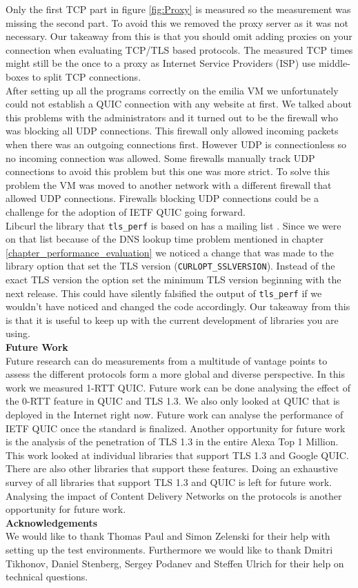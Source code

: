Only the first TCP part in figure \ref{fig:Proxy} is measured so the measurement was missing the second part.
To avoid this we removed the proxy server as it was not necessary.
Our takeaway from this is that you should omit adding proxies on your connection when evaluating TCP/TLS based protocols.
The measured TCP times might still be the once to a proxy as Internet Service Providers (ISP) use middle-boxes to split TCP connections. \\


After setting up all the programs correctly on the emilia VM we unfortunately could not establish a QUIC connection with any website at first.
We talked about this problems with the administrators and it turned out to be the firewall who was blocking all UDP connections.
This firewall only allowed incoming packets when there was an outgoing connections first.
However UDP is connectionless so no incoming connection was allowed.
Some firewalls manually track UDP connections to avoid this problem but this one was more strict.
To solve this problem the VM was moved to another network with a different firewall that allowed UDP connections.
Firewalls blocking UDP connections could be a challenge for the adoption of IETF QUIC going forward.\\

Libcurl the library that \texttt{tls\_perf} is based on has a mailing list \cite{Link:LibcurlMail}.
Since we were on that list because of the DNS lookup time problem mentioned in chapter \ref{chapter_performance_evaluation} we noticed a change that was made to the library option that set the TLS version (\verb|CURLOPT_SSLVERSION|).
Instead of the exact TLS version the option set the minimum TLS version beginning with the next release.
This could have silently falsified the output of \texttt{tls\_perf} if we wouldn't have noticed and changed the code accordingly.
Our takeaway from this is that it is useful to keep up with the current development of libraries you are using.\\


\textbf{Future Work}\\
Future research can do measurements from a multitude of vantage points to assess the different protocols form a more global and diverse perspective.
In this work we measured 1-RTT QUIC. Future work can be done analysing the effect of the 0-RTT feature in QUIC and TLS 1.3.
We also only looked at QUIC that is deployed in the Internet right now. Future work can analyse the performance of IETF QUIC once the standard is finalized.
Another opportunity for future work is the analysis of the penetration of TLS 1.3 in the entire Alexa Top 1 Million. 
This work looked at individual libraries that support TLS 1.3 and Google QUIC. There are also other libraries that support these features. Doing an exhaustive survey of all libraries that support TLS 1.3 and QUIC is left for future work.
Analysing the impact of Content Delivery Networks on the protocols is another opportunity for future work.\\

\textbf{Acknowledgements}\\
We would like to thank Thomas Paul and Simon Zelenski for their help with setting up the test environments.
Furthermore we would like to thank Dmitri Tikhonov, Daniel Stenberg, Sergey Podanev and Steffen Ulrich for their help on technical questions.